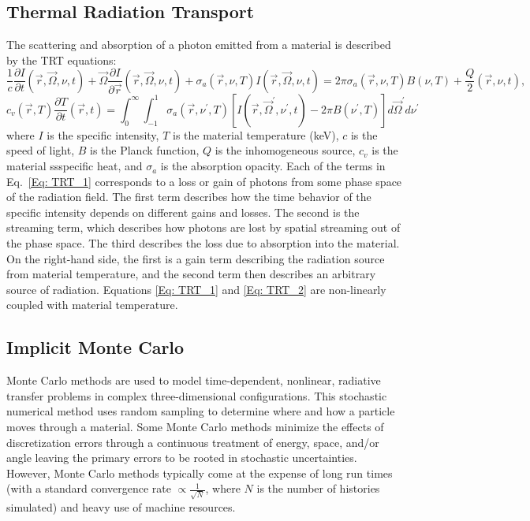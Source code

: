 \documentclass[]{article}
\begin{document}
	\subsection{Thermal Radiation Transport}
		The scattering and absorption of a photon emitted from a material is described by the TRT equations:
		\begin{equation} \label{Eq: TRT_1}
		\frac{1}{c} \frac{\partial I}{\partial t}(\vec{r}, \vec{\Omega}, \nu, t) + \vec{\Omega} \frac{\partial I}{\partial \vec{r}}(\vec{r}, \vec{\Omega}, \nu, t) + \sigma_{a}(\vec{r}, \nu, T)I(\vec{r}, \vec{\Omega}, \nu, t) = 2 \pi \sigma_{a}(\vec{r}, \nu, T)B(\nu, T) + \frac{Q}{2}(\vec{r}, \nu, t),
		\end{equation}
		\begin{equation} \label{Eq: TRT_2}
		c_{v}(\vec{r}, T) \frac{\partial T}{\partial t}(\vec{r},t) = \int_{0}^{\infty} \int_{-1}^{1} \sigma_{a}(\vec{r}, \nu^{\prime}, T)[I(\vec{r}, \vec{\Omega}^{\prime}, \nu^{\prime}, t) - 2 \pi B(\nu^{\prime}, T)] d \vec{\Omega}^{\prime} d \nu^{\prime}
		\end{equation}
		where $I$ is the specific intensity, $T$ is the material temperature (keV), $c$ is the speed of light, $B$ is the Planck function, $Q$ is the inhomogeneous source, $c_{v}$ is the material ssspecific heat, and $\sigma_{a}$ is the absorption opacity. Each of the terms in Eq.~\ref{Eq: TRT_1} corresponds to a loss or gain of photons from some phase space of the radiation field. The first term describes how the time behavior of the specific intensity depends on different gains and losses. The second is the streaming term, which describes how photons are lost by spatial streaming out of the phase space. The third describes the loss due to absorption into the material. On the right-hand side, the first is a gain term describing the radiation source from material temperature, and the second term then describes an arbitrary source of radiation. Equations \ref{Eq: TRT_1} and \ref{Eq: TRT_2} are non-linearly coupled with material temperature.

	\subsection{Implicit Monte Carlo}
		Monte Carlo methods are used to model time-dependent, nonlinear, radiative transfer problems in complex three-dimensional configurations. This stochastic numerical method uses random sampling to determine where and how a particle moves through a material. Some Monte Carlo methods minimize the effects of discretization errors through a continuous treatment of energy, space, and/or angle leaving the primary errors to be rooted in stochastic uncertainties. However, Monte Carlo methods typically come at the expense of long run times (with a standard convergence rate $\propto\frac{1}{\sqrt{N}}$, where $N$ is the number of histories simulated) and heavy use of machine resources.
\end{document}
